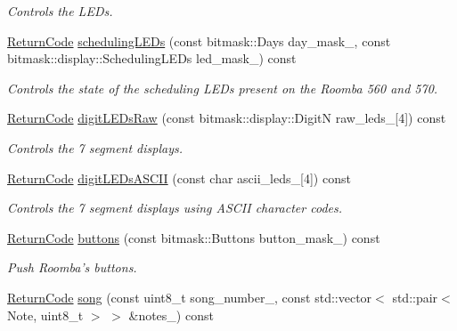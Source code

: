 \begin{DoxyCompactItemize}
\begin{DoxyCompactList}\small\item\em Controls the L\+E\+Ds. \end{DoxyCompactList}\item 
\hyperlink{classroomba_1_1series500_1_1_open_interface_a43fc2ae1216e57cfb46901331b9ab4c7}{Return\+Code} \hyperlink{classroomba_1_1series500_1_1_open_interface_a9d7f8c1cca2d76a71fae39d7b29ebe94}{scheduling\+L\+E\+Ds} (const bitmask\+::\+Days day\+\_\+mask\+\_\+, const bitmask\+::display\+::\+Scheduling\+L\+E\+Ds led\+\_\+mask\+\_\+) const 
\begin{DoxyCompactList}\small\item\em Controls the state of the scheduling L\+E\+Ds present on the Roomba 560 and 570. \end{DoxyCompactList}\item 
\hyperlink{classroomba_1_1series500_1_1_open_interface_a43fc2ae1216e57cfb46901331b9ab4c7}{Return\+Code} \hyperlink{classroomba_1_1series500_1_1_open_interface_a76c9b0291da94519b91ec5e6d9409838}{digit\+L\+E\+Ds\+Raw} (const bitmask\+::display\+::\+Digit\+N raw\+\_\+leds\+\_\+\mbox{[}4\mbox{]}) const 
\begin{DoxyCompactList}\small\item\em Controls the 7 segment displays. \end{DoxyCompactList}\item 
\hyperlink{classroomba_1_1series500_1_1_open_interface_a43fc2ae1216e57cfb46901331b9ab4c7}{Return\+Code} \hyperlink{classroomba_1_1series500_1_1_open_interface_a60f023e5d923f0cd66a5f69e0b094c8a}{digit\+L\+E\+Ds\+A\+S\+C\+I\+I} (const char ascii\+\_\+leds\+\_\+\mbox{[}4\mbox{]}) const 
\begin{DoxyCompactList}\small\item\em Controls the 7 segment displays using A\+S\+C\+I\+I character codes. \end{DoxyCompactList}\item 
\hyperlink{classroomba_1_1series500_1_1_open_interface_a43fc2ae1216e57cfb46901331b9ab4c7}{Return\+Code} \hyperlink{classroomba_1_1series500_1_1_open_interface_a4e44856c9785a94f84b74d87138db7ec}{buttons} (const bitmask\+::\+Buttons button\+\_\+mask\+\_\+) const 
\begin{DoxyCompactList}\small\item\em Push Roomba’s buttons. \end{DoxyCompactList}\item 
\hyperlink{classroomba_1_1series500_1_1_open_interface_a43fc2ae1216e57cfb46901331b9ab4c7}{Return\+Code} \hyperlink{classroomba_1_1series500_1_1_open_interface_a316b270bdf96b6b89c9ecc8a4f7a39bd}{song} (const uint8\+\_\+t song\+\_\+number\+\_\+, const std\+::vector$<$ std\+::pair$<$ Note, uint8\+\_\+t $>$ $>$ \&notes\+\_\+) const 

\end{DoxyCompactItemize}
